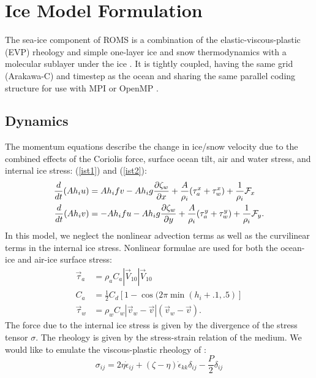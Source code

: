 \section{Ice Model Formulation}
\label{Iphys}

The sea-ice component of ROMS is a combination of the
elastic-viscous-plastic (EVP) rheology 
\citep{Hunke97,Hunke_2001} and simple one-layer
ice and snow thermodynamics with a molecular sublayer under the ice
\citep{Mellor89}. It is tightly coupled, having
the same grid (Arakawa-C) and timestep as the ocean and sharing the same
parallel coding structure for use with MPI or OpenMP \citep{Budgell05}.

\subsection{Dynamics}
The momentum equations describe the change in ice/snow velocity due
to the combined effects of the Coriolis force, surface ocean tilt,
air and water stress, and internal ice stress:
(\ref{ist1}) and (\ref{ist2}):
\begin{align}
  \frac{d}{ dt}(A h_i u)
 & = A h_i fv - A h_i g \frac{\partial \zeta_w }{ \partial x} +
 \frac{A}{\rho_i}(\tau_a^x + \tau_w^x) + \frac{1}{\rho_i}{\cal F}_x
\label{ist1} \\
  \frac{d}{ d t}(A h_i v)
 & = - A h_i fu - A h_i g \frac{\partial \zeta_w }{ \partial y} +
 \frac{A}{\rho_i}(\tau_a^y + \tau_w^y) + \frac{1}{\rho_i}{\cal F}_y.
\label{ist2}
\end{align}
In this model, we neglect the nonlinear advection terms as well as
the curvilinear terms in the internal ice stress.
Nonlinear formulae are used for both the ocean-ice and air-ice surface
stress:
\begin{align}
  \vec{\tau}_a & = \rho_a C_a | \vec{V}_{10} | \vec{V}_{10} \\
  C_a & = \frac{1 }{ 2} C_d \left[ 1 - \cos( 2 \pi \min(h_i+.1, .5)
  \right] \\
  \vec{\tau}_w & = \rho_w C_w | \vec{v}_w - \vec{v} |
  ( \vec{v}_w - \vec{v}) .
\end{align}
The force due to the internal ice stress is given by the divergence of
the stress tensor $\sigma$. The rheology is given by the stress-strain
relation of the medium. We would like to emulate the viscous-plastic
rheology of \citet{Hibler79}:
\begin{equation}
  \sigma_{ij} = 2 \eta \dot \epsilon_{ij} + (\zeta - \eta) \dot
  \epsilon_{kk} \delta_{ij} - \frac{P }{ 2} \delta_{ij}
\end{equation}

